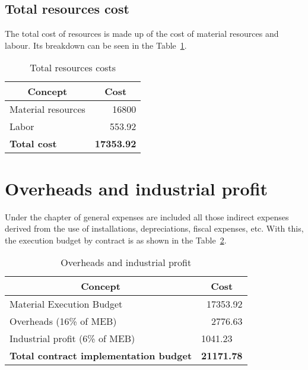 \subsection*{Total resources cost}
The total cost of resources is made up of the cost of material resources and labour. Its breakdown can be seen in the Table~\ref{tab:totalresources}.

\begin{table}[]
\centering
\begin{tabular}{|l|r|}
\hline
\multicolumn{1}{|c|}{\textbf{Concept}} & \multicolumn{1}{c|}{\textbf{Cost}} \\ \hline
Material resources                     & 16800                              \\ \hline
Labor                                  & 553.92                             \\ \hline\hline
\textbf{Total cost}                    & \textbf{17353.92}                  \\ \hline
\end{tabular}
\caption{Total resources costs}
\label{tab:totalresources}
\end{table}

\section*{Overheads and industrial profit}
Under the chapter of general expenses are included all those indirect expenses derived from the use of installations, depreciations, fiscal expenses, etc. With this, the execution budget by contract is as shown in the Table~\ref{tab:overheads}.

\begin{table}[h]
\centering
\begin{tabular}{|l|r|}
\hline
\multicolumn{1}{|c|}{\textbf{Concept}}        & \multicolumn{1}{c|}{\textbf{Cost}} \\ \hline
Material Execution Budget                     & 17353.92                           \\ \hline
Overheads (16\% of MEB)                       & 2776.63                            \\ \hline
Industrial profit (6\% of MEB)                & \multicolumn{1}{l|}{1041.23}       \\ \hline\hline
\textbf{Total contract implementation budget} & \textbf{21171.78}                  \\ \hline
\end{tabular}
\caption{Overheads and industrial profit}
\label{tab:overheads}
\end{table}


